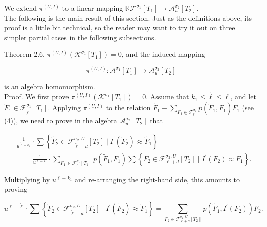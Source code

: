 \documentclass[10pt]{article}
\begin{document}
We extend $\pi^{(U, I)}$ to a linear mapping $\mathbb{R} \mathcal{F}^{\sigma_{1}}\left[T_{1}\right] \longrightarrow \mathcal{A}_{u}^{\sigma_{2}}\left[T_{2}\right]$.\\
The following is the main result of this section. Just as the definitions above, its proof is a little bit technical, so the reader may want to try it out on three simpler partial cases in the following subsections.

Theorem 2.6. $\pi^{(U, I)}\left(\mathcal{K}^{\sigma_{1}}\left[T_{1}\right]\right)=0$, and the induced mapping

$$
\pi^{(U, I)}: \mathcal{A}^{\sigma_{1}}\left[T_{1}\right] \longrightarrow \mathcal{A}_{u}^{\sigma_{2}}\left[T_{2}\right]
$$

is an algebra homomorphism.\\
Proof. We first prove $\pi^{(U, I)}\left(\mathcal{K}^{\sigma_{1}}\left[T_{1}\right]\right)=0$. Assume that $k_{1} \leq \tilde{\ell} \leq \ell$, and let $\widetilde{F}_{1} \in \mathcal{F}_{\tilde{\ell}}^{\sigma_{1}}\left[T_{1}\right]$. Applying $\pi^{(U, I)}$ to the relation $\widetilde{F}_{1}-\sum_{F_{1} \in \mathcal{F}_{\ell}^{\sigma_{1}}} p\left(\widetilde{F}_{1}, F_{1}\right) F_{1}$ (see (4)), we need to prove in the algebra $\mathcal{A}_{u}^{\sigma_{2}}\left[T_{2}\right]$ that

$$
\begin{aligned}
& \frac{1}{u^{\tilde{\ell}-k_{1}}} \cdot \sum\left\{\widetilde{F}_{2} \in \mathcal{F}_{\tilde{\ell}+d}^{\sigma_{2}, U}\left[T_{2}\right] \mid I^{\prime}\left(\widetilde{F}_{2}\right) \approx \widetilde{F}_{1}\right\} \\
& \quad=\frac{1}{u^{\ell-k_{1}}} \cdot \sum_{F_{1} \in \mathcal{F}_{\ell}^{\sigma_{1}}\left[T_{1}\right]} p\left(\widetilde{F}_{1}, F_{1}\right) \sum\left\{F_{2} \in \mathcal{F}_{\ell+d}^{\sigma_{2}, U}\left[T_{2}\right] \mid I^{\prime}\left(F_{2}\right) \approx F_{1}\right\} .
\end{aligned}
$$

Multiplying by $u^{\ell-k_{1}}$ and re-arranging the right-hand side, this amounts to proving

$$
u^{\ell-\tilde{\ell}} \cdot \sum\left\{\widetilde{F}_{2} \in \mathcal{F}_{\tilde{\ell}+d}^{\sigma_{2}, U}\left[T_{2}\right] \mid I^{\prime}\left(\widetilde{F}_{2}\right) \approx \widetilde{F}_{1}\right\}=\sum_{F_{2} \in \mathcal{F}_{\ell+d}^{\sigma_{2}, U}\left[T_{2}\right]} p\left(\widetilde{F}_{1}, I^{\prime}\left(F_{2}\right)\right) F_{2} .
$$
\end{document}
